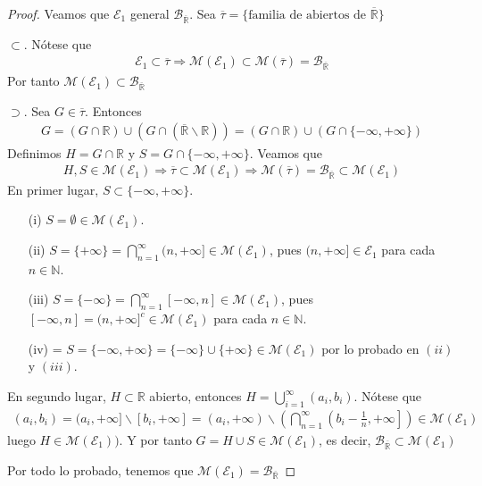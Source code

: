 \begin{proof}
    Veamos que $\mathcal{E}_1$ general $\mathcal{B}_{\overline{\mathbb{R}}}$. Sea $\overline{\tau} = \{ \text{familia de abiertos de } \overline{\mathbb{R}}\}$

    $\subset$. Nótese que
    \begin{align*}
        \mathcal{E}_1 \subset \overline{\tau} \Longrightarrow \mathcal{M}(\mathcal{E}_1) \subset \mathcal{M}(\overline{\tau}) = \mathcal{B}_{\overline{\mathbb{R}}}
    \end{align*}
    Por tanto $\mathcal{M}(\mathcal{E}_1) \subset \mathcal{B}_{\overline{\mathbb{R}}}$

    $\supset$. Sea $G \in \overline{\tau}$. Entonces
    \begin{align*}
        G = (G \cap \mathbb{R}) \cup (G \cap (\overline{\mathbb{R}} \backslash \mathbb{R})) = (G \cap \mathbb{R}) \cup (G \cap \{ -\infty, +\infty \})
    \end{align*}
    Definimos $H = G \cap \mathbb{R}$ y $S = G \cap \{ -\infty, +\infty \}$. Veamos que
    \begin{align*}
        H,S \in \mathcal{M}(\mathcal{E}_1) \Longrightarrow \overline{\tau} \subset \mathcal{M}(\mathcal{E}_1) \Longrightarrow \mathcal{M}(\overline{\tau}) = \mathcal{B}_{\overline{\mathbb{R}}} \subset \mathcal{M}(\mathcal{E}_1)
    \end{align*}
    En primer lugar, $S \subset \{ -\infty, +\infty \}$.
    \begin{enumerate}
        \item[(i)] $S = \emptyset \in \mathcal{M}(\mathcal{E}_1)$.
        \item[(ii)] $S = \{ +\infty \} = \bigcap_{n=1}^{\infty}{(n, +\infty]} \in \mathcal{M}(\mathcal{E}_1)$, pues $(n, +\infty] \in \mathcal{E}_1$ para cada $n \in \mathbb{N}$.
        \item[(iii)] $S = \{ -\infty \} = \bigcap_{n=1}^{\infty}{[-\infty,n]} \in \mathcal{M}(\mathcal{E}_1)$, pues $[-\infty,n] = (n, +\infty]^c \in \mathcal{M}(\mathcal{E}_1)$ para cada $n \in \mathbb{N}$.
        \item[(iv)] = $S = \{ -\infty, +\infty \} = \{ -\infty \} \cup \{ +\infty\} \in \mathcal{M}(\mathcal{E}_1)$ por lo probado en $(ii)$ y $(iii)$.
    \end{enumerate}
    En segundo lugar, $H \subset \mathbb{R}$ abierto, entonces $H = \bigcup_{i=1}^{\infty}{(a_i,b_i)}$. Nótese que
    \begin{align*}
        (a_i,b_i) = (a_i,+\infty] \backslash [b_i, +\infty] = (a_i, +\infty) \backslash \left( \bigcap_{n=1}^{\infty}{\left( b_i - \frac{1}{n}, +\infty\right] } \right) \in \mathcal{M}(\mathcal{E}_1)
    \end{align*}
    luego $H \in \mathcal{M}(\mathcal{E}_1))$. Y por tanto $G = H \cup S \in \mathcal{M}(\mathcal{E}_1)$, es decir,  $\mathcal{B}_{\overline{\mathbb{R}}} \subset \mathcal{M}(\mathcal{E}_1)$

    Por todo lo probado, tenemos que $\mathcal{M}(\mathcal{E}_1) = \mathcal{B}_{\overline{\mathbb{R}}}$
\end{proof}

